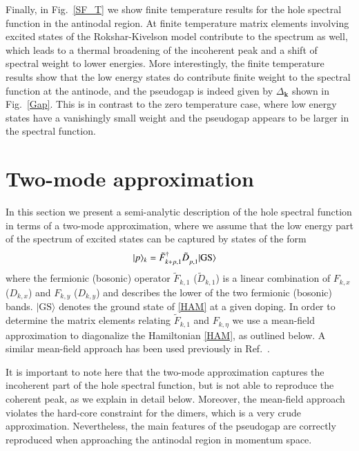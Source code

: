 \documentclass[aps,pra,reprint,showpacs,superscriptaddress]{revtex4-1}
\DeclarePairedDelimiter\ket{\lvert}{\rangle}
\newcommand{\cre}[2]{{#1}^{\dagger}_{#2}}
\newcommand{\ann}[2]{{#1}^{\phantom{\dagger}}_{#2}}
\begin{document}
Finally, in Fig.~\ref{SF_T} we show finite temperature results for the hole spectral function in the antinodal region. At finite temperature matrix elements involving excited states of the Rokshar-Kivelson model contribute to the spectrum as well, which leads to a thermal broadening of the incoherent peak and a shift of spectral weight to lower energies.
More interestingly, the finite temperature results show that the low energy states do contribute finite weight to the spectral function at the antinode, and the pseudogap is indeed given by $\Delta_\mathbf{k}$ shown in Fig.~\ref{Gap}.
This is in contrast to the zero temperature case, where low energy states have a vanishingly small weight and the pseudogap appears to be larger in the spectral function.

\section{Two-mode approximation}\label{MF}

In this section we present a semi-analytic description of the hole spectral function in terms of a two-mode approximation, where we assume that the low energy part of the spectrum of excited states can be captured by states of the form
\begin{align}
\ket{p}_k &=\cre{\tilde{F}}{k+p,1}\ann{\tilde{D}}{p,1}\ket{\text{GS}}  \label{ApproxExcit}
\end{align}
where the fermionic (bosonic) operator $\tilde{F}_{k,1}$ ($\tilde{D}_{k,1}$) is a linear combination of $F_{k,x}$ ($D_{k,x}$) and $F_{k,y}$ ($D_{k,y}$) and  describes the lower of the two fermionic (bosonic) bands. $|\text{GS}\rangle$ denotes the ground state of \eqref{HAM} at a given doping.  
In order to determine the matrix elements relating $\tilde{F}_{k,1}$ and $F_{k,\eta}$ we use a mean-field approximation to diagonalize the Hamiltonian \eqref{HAM}, as outlined below. A similar mean-field approach has been used previously in Ref.~\cite{goldstein2017d}.

It is important to note here that the two-mode approximation captures the incoherent part of the hole spectral function, but is not able to reproduce the coherent peak, as we explain in detail below. Moreover, the mean-field approach violates the hard-core constraint for the dimers, which is a very crude approximation. Nevertheless, the main features of the pseudogap are correctly reproduced when approaching the antinodal region in momentum space.
\end{document}

